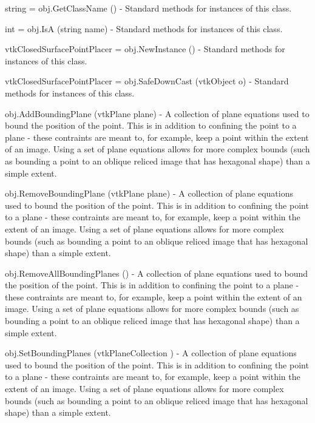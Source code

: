 \begin{DoxyItemize}
\item {\ttfamily string = obj.\-Get\-Class\-Name ()} -\/ Standard methods for instances of this class.  
\item {\ttfamily int = obj.\-Is\-A (string name)} -\/ Standard methods for instances of this class.  
\item {\ttfamily vtk\-Closed\-Surface\-Point\-Placer = obj.\-New\-Instance ()} -\/ Standard methods for instances of this class.  
\item {\ttfamily vtk\-Closed\-Surface\-Point\-Placer = obj.\-Safe\-Down\-Cast (vtk\-Object o)} -\/ Standard methods for instances of this class.  
\item {\ttfamily obj.\-Add\-Bounding\-Plane (vtk\-Plane plane)} -\/ A collection of plane equations used to bound the position of the point. This is in addition to confining the point to a plane -\/ these contraints are meant to, for example, keep a point within the extent of an image. Using a set of plane equations allows for more complex bounds (such as bounding a point to an oblique reliced image that has hexagonal shape) than a simple extent.  
\item {\ttfamily obj.\-Remove\-Bounding\-Plane (vtk\-Plane plane)} -\/ A collection of plane equations used to bound the position of the point. This is in addition to confining the point to a plane -\/ these contraints are meant to, for example, keep a point within the extent of an image. Using a set of plane equations allows for more complex bounds (such as bounding a point to an oblique reliced image that has hexagonal shape) than a simple extent.  
\item {\ttfamily obj.\-Remove\-All\-Bounding\-Planes ()} -\/ A collection of plane equations used to bound the position of the point. This is in addition to confining the point to a plane -\/ these contraints are meant to, for example, keep a point within the extent of an image. Using a set of plane equations allows for more complex bounds (such as bounding a point to an oblique reliced image that has hexagonal shape) than a simple extent.  
\item {\ttfamily obj.\-Set\-Bounding\-Planes (vtk\-Plane\-Collection )} -\/ A collection of plane equations used to bound the position of the point. This is in addition to confining the point to a plane -\/ these contraints are meant to, for example, keep a point within the extent of an image. Using a set of plane equations allows for more complex bounds (such as bounding a point to an oblique reliced image that has hexagonal shape) than a simple extent.  

\end{DoxyItemize}
